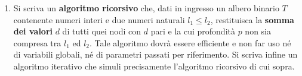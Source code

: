 \begin{enumerate}
\item Si scriva un \textbf{algoritmo ricorsivo} che, dati in ingresso un albero binario $T$ contenente numeri interi e due numeri naturali $l_{1} \leq l_{2}$, restituisca la \textbf{somma dei valori} $d$ di tutti quei nodi con $d$ pari e la cui profondità $p$ non sia compresa tra $l_{1}$ ed $l_{2}$. Tale algoritmo dovrà essere efficiente e non far uso né di variabili globali, né di parametri passati per riferimento. Si scriva infine un algoritmo iterativo che simuli precisamente l'algoritmo ricorsivo di cui sopra.
\end{enumerate}

